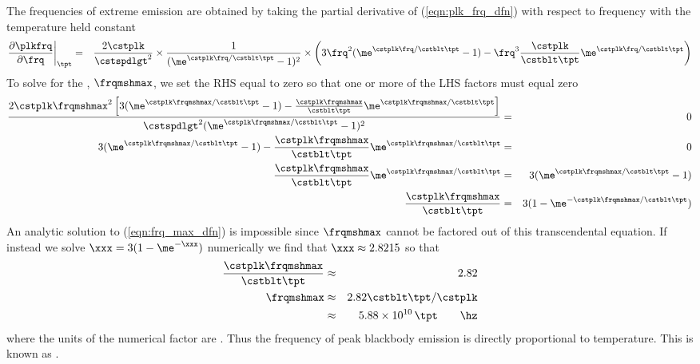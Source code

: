 \documentclass[12pt]{article}
\begin{document}
The frequencies of extreme emission are obtained by taking
the partial derivative of (\ref{eqn:plk_frq_dfn}) with respect to
frequency with the temperature held constant
\begin{eqnarray}
\frac{\partial \plkfrq}{\partial \frq} 
\bigg|_{\tpt}
& = &
\frac{2 \cstplk}{\cstspdlgt^{2}} \times
\frac{1}{( \me^{\cstplk \frq / \cstblt \tpt}- 1)^{2}} \times
\left( 3 \frq^{2} ( \me^{\cstplk \frq / \cstblt \tpt}- 1) -
\frq^{3} \frac{\cstplk}{\cstblt \tpt} \me^{\cstplk \frq / \cstblt \tpt} \right)
\nonumber
\end{eqnarray}
To solve for the , $\frqmshmax$, 
we set the RHS equal to zero so that one or more of the LHS factors
must equal zero 
\begin{eqnarray}
\frac{2 \cstplk \frqmshmax^{2}
\left[ 3 ( \me^{\cstplk \frqmshmax / \cstblt \tpt}- 1 ) -
\frac{\cstplk \frqmshmax}{\cstblt \tpt} \me^{\cstplk \frqmshmax / \cstblt \tpt} \right] }
{\cstspdlgt^{2} ( \me^{\cstplk \frqmshmax / \cstblt \tpt}- 1)^{2}}
& = & 0
\nonumber \\
3 ( \me^{\cstplk \frqmshmax / \cstblt \tpt}- 1 ) -
\frac{\cstplk \frqmshmax}{\cstblt \tpt} \me^{\cstplk \frqmshmax / \cstblt \tpt}
& = & 0
\nonumber \\
\frac{\cstplk \frqmshmax}{\cstblt \tpt} \me^{\cstplk \frqmshmax / \cstblt \tpt}
& = &
3 ( \me^{\cstplk \frqmshmax / \cstblt \tpt}- 1 )
\nonumber \\
\frac{\cstplk \frqmshmax}{\cstblt \tpt}
& = &
3 ( 1 - \me^{-\cstplk \frqmshmax / \cstblt \tpt})
\label{eqn:frq_max_dfn}
\end{eqnarray}
An analytic solution to (\ref{eqn:frq_max_dfn}) is impossible since
$\frqmshmax$ cannot be factored out of this transcendental equation.
If instead we solve $\xxx = 3 ( 1 - \me^{-\xxx})$ numerically we find
that $\xxx \approx 2.8215$ so that 
\begin{eqnarray}
\frac{\cstplk \frqmshmax}{\cstblt \tpt} & \approx & 2.82 \nonumber \\
\frqmshmax & \approx & 2.82 \cstblt \tpt / \cstplk \nonumber \\
& \approx & 5.88 \times 10^{10} \, \tpt \qquad\mbox{\hz}
\label{eqn:frq_max_apx}
\end{eqnarray}
where the units of the numerical factor are \hzxk.
Thus the frequency of peak blackbody emission is directly
proportional to temperature.
This is known as .
\end{document}
